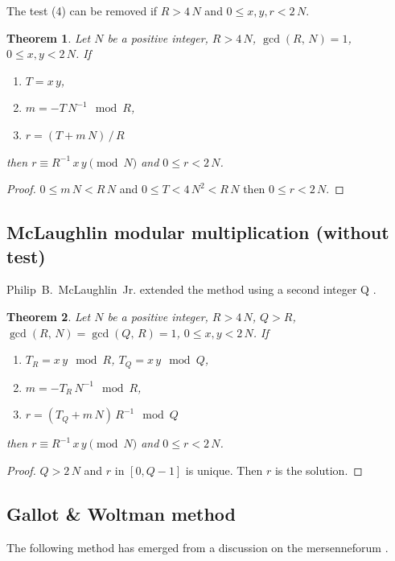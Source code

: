 \documentclass[a4paper, 12pt, pdftex]{article}
\theoremstyle{plain}
\newtheorem{theorem}{Theorem}
\theoremstyle{definition}
\begin{document}
The test (4) can be removed if $R > 4\,N$ and $0 \leq x, y, r < 2\,N$.
\begin{theorem}
Let $N$ be a positive integer, $R > 4\,N$, $\gcd(R,\, N) = 1$, $0 \leq x, y < 2\,N$. If
\begin{enumerate}[label={(\arabic*)}]
\item $T = x\,y$,
\item $m = -T\,N^{-1} \mod R$,
\item $r = (T + m\, N)\, /\, R$
\end{enumerate}
then $r \equiv R^{-1}\, x\,y \pmod N$ and $0 \leq r < 2\,N$.
\end{theorem}
\begin{proof}
$0 \leq m\, N < R\, N$ and $0 \leq T < 4\,N^2 < R\, N$ then $0 \leq r < 2\,N$.
\end{proof}

\subsection*{McLaughlin modular multiplication (without test)}

Philip~B.~McLaughlin~Jr. extended the method using a second integer Q \cite{McLaughlin1}.

\begin{theorem}
Let $N$ be a positive integer, $R > 4\,N$, $Q > R$,
$\gcd(R,\, N) = \gcd(Q,\, R) = 1$, $0 \leq x, y < 2\,N$. If
\begin{enumerate}[label={(\arabic*)}]
\item $T_R = x\,y \mod R$, $T_Q = x\,y \mod Q$,
\item $m = -T_R\,N^{-1} \mod R$,
\item $r = (T_Q + m\, N)\, R^{-1} \mod Q$
\end{enumerate}
then $r \equiv R^{-1}\, x\,y \pmod N$ and $0 \leq r < 2\,N$.
\end{theorem}
\begin{proof}
$Q > 2\,N$ and $r$ in $[0, Q - 1]$ is unique. Then $r$ is the solution.
\end{proof}

\subsection*{Gallot \& Woltman method}

The following method has emerged from a discussion on the mersenneforum \cite{Gallot1}.\\
\end{document}
